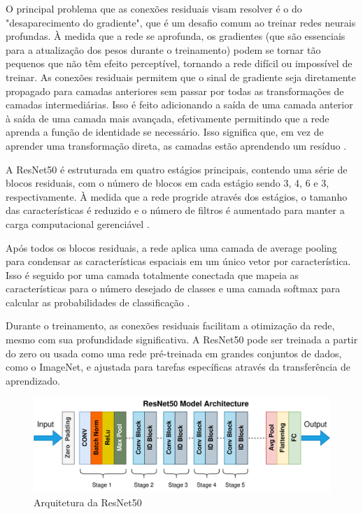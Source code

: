 O principal problema que as conexões residuais visam resolver é o do "desaparecimento do gradiente", que é um desafio comum ao treinar redes neurais profundas. À medida que a rede se aprofunda, os gradientes (que são essenciais para a atualização dos pesos durante o treinamento) podem se tornar tão pequenos que não têm efeito perceptível, tornando a rede difícil ou impossível de treinar. As conexões residuais permitem que o sinal de gradiente seja diretamente propagado para camadas anteriores sem passar por todas as transformações de camadas intermediárias. Isso é feito adicionando a saída de uma camada anterior à saída de uma camada mais avançada, efetivamente permitindo que a rede aprenda a função de identidade se necessário. Isso significa que, em vez de aprender uma transformação direta, as camadas estão aprendendo um resíduo \cite{He2015}.

A ResNet50 é estruturada em quatro estágios principais, contendo uma série de blocos residuais, com o número de blocos em cada estágio sendo 3, 4, 6 e 3, respectivamente. À medida que a rede progride através dos estágios, o tamanho das características é reduzido e o número de filtros é aumentado para manter a carga computacional gerenciável \cite{Sharma2022Enhanced}.

Após todos os blocos residuais, a rede aplica uma camada de average pooling para condensar as características espaciais em um único vetor por característica. Isso é seguido por uma camada totalmente conectada que mapeia as características para o número desejado de classes e uma camada softmax para calcular as probabilidades de classificação \cite{Sharma2022Enhanced}.

Durante o treinamento, as conexões residuais facilitam a otimização da rede, mesmo com sua profundidade significativa. A ResNet50 pode ser treinada a partir do zero ou usada como uma rede pré-treinada em grandes conjuntos de dados, como o ImageNet, e ajustada para tarefas específicas através da transferência de aprendizado.


\begin{figure}[!ht]
    \begin{center}
    \includegraphics[width=350pt]{pictures/ResNet50.png}
    \caption{Arquitetura da ResNet50}
    \label{pic:resnet50}
    \end{center}
\end{figure}


